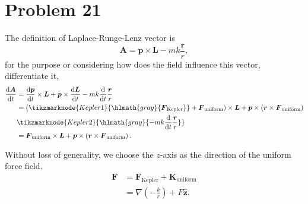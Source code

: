 \section*{Problem 21}

    The definition of Laplace-Runge-Lenz vector is
    \begin{equation}
        \boldsymbol{A} = \boldsymbol{p} \times \boldsymbol{L} -mk\frac{\boldsymbol{r}}{r},
    \end{equation}
    for the purpose or considering how does the field influence this vector, differentiate it,
    \begin{align}
        \frac{\mathrm{d}\boldsymbol{A}}{\mathrm{d}t} &= \frac{\mathrm{d}\boldsymbol{p}}{\mathrm{d}t}\times\boldsymbol{L} + \boldsymbol{p}\times\frac{\mathrm{d}\boldsymbol{L}}{\mathrm{d}t} - mk\frac{\mathrm{d}}{\mathrm{d}t}\frac{\boldsymbol{r}}{r}\nonumber
        \\
        & = \left( \tikzmarknode{Kepler1}{\hlmath{gray}{\boldsymbol{F}_{\text{Kepler}}}} + \boldsymbol{F}_{\text{uniform}} \right)\times\boldsymbol{L} + \boldsymbol{p}\times\left(\boldsymbol{r}\times\boldsymbol{F}_{\text{uniform}}\right)\nonumber
        \\
        &\tikzmarknode{Kepler2}{\hlmath{gray}{- mk\frac{\mathrm{d}}{\mathrm{d}t}\frac{\boldsymbol{r}}{r}}}\nonumber
        \\
        & = \boldsymbol{F}_{\text{uniform}}\times\boldsymbol{L} + \boldsymbol{p}\times\left(\boldsymbol{r}\times\boldsymbol{F}_{\text{uniform}}\right).
    \end{align}

    Without loss of generality, we choose the $z$-axis as the direction of the uniform force field.
    \begin{align}
        \boldsymbol{F} &= \boldsymbol{F}_{\text{Kepler}} + \boldsymbol{K}_{\text{uniform}}\nonumber
        \\
        & = \nabla(-\frac{k}{r}) + F\hat{\boldsymbol{z}}.
    \end{align}